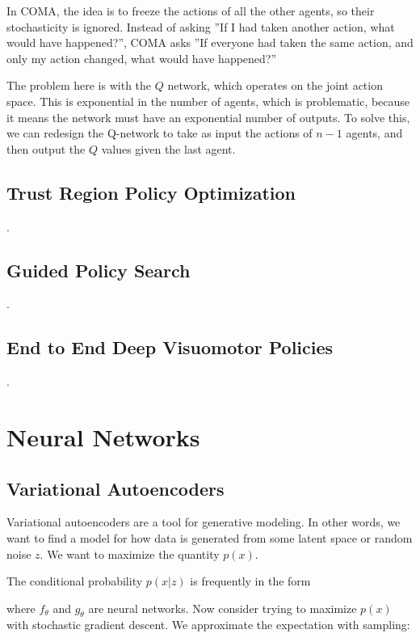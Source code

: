 \documentclass[12pt]{article}
\begin{document}
In COMA, the idea is to freeze the actions of all the other agents, so their stochasticity is ignored. Instead of asking ''If I had taken another action, what would have happened?'', COMA asks ''If everyone had taken the same action, and only my action changed, what would have happened?''


The problem here is with the $Q$ network, which operates on the joint action space. This is exponential in the number of agents, which is problematic, because it means the network must have an exponential number of outputs. To solve this, we can redesign the Q-network to take as input the actions of $n-1$ agents, and then output the $Q$ values given the last agent. 

\subsection{Trust Region Policy Optimization}
.
\subsection{Guided Policy Search}
.
\subsection{End to End Deep Visuomotor Policies}
.

\section{Neural Networks}

\subsection{Variational Autoencoders}

Variational autoencoders are a tool for generative modeling. In other words, we want to find a model for how data is generated from some latent space or random noise $z$. We want to maximize the quantity $p(x)$.


The conditional probability $p(x|z)$ is frequently in the form


where $f_\theta$ and $g_\theta$ are neural networks. Now consider trying to maximize $p(x)$ with stochastic gradient descent. We approximate the expectation with sampling:
\end{document}
